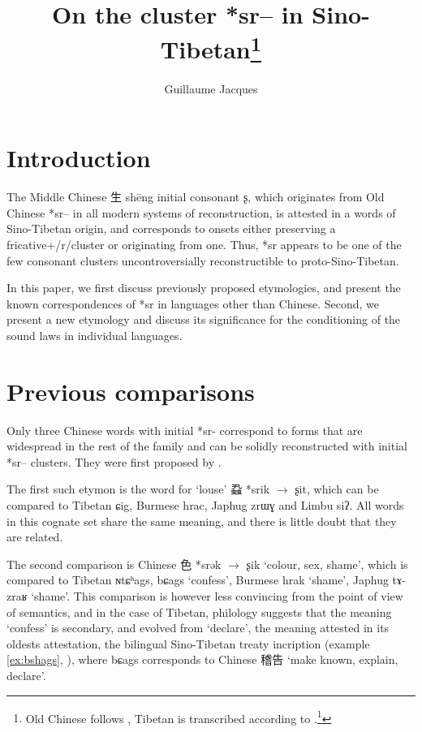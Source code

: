 \documentclass[oldfontcommands,oneside,a4paper,11pt]{article}
\newcommand{\ipa}[1]{{\phon #1}} %
\newcommand{\zh}[1]{{\cn #1}}
\begin{document}
 


\title{On the cluster *sr-- in Sino-Tibetan\footnote{Old Chinese follows \citealt{bs14oc}, Tibetan is transcribed according to \citet{jacques12transcription}.\footnote{Acknowledgements %
}}}
\author{Guillaume Jacques}
\maketitle

\section{Introduction}

The Middle Chinese \zh{生} shēng initial consonant \ipa{ʂ}, which originates from Old Chinese *\ipa{sr--} in all modern systems of reconstruction, is attested in a words of Sino-Tibetan origin, and corresponds to onsets either preserving a fricative+/r/cluster or originating from one. Thus, *sr appears to be  one of the few consonant clusters uncontroversially reconstructible to proto-Sino-Tibetan. 

In this paper, we first discuss previously proposed etymologies, and present the known correspondences of *sr in languages other than Chinese. Second, we present a new etymology and discuss its significance for the conditioning of the sound laws in individual languages.

\section{Previous comparisons} \label{sec:previous}
Only three Chinese words with initial *\ipa{sr-} correspond to forms that are widespread in the rest of the family and can be solidly reconstructed with initial *\ipa{sr--} clusters.  They were first proposed by \citet{benedict72}.

The first such etymon is the word for `louse' \zh{蝨} *\ipa{srik} $\rightarrow$ \ipa{ʂit}, which can be compared to Tibetan \ipa{ɕig}, Burmese \ipa{hrac}, Japhug \ipa{zrɯɣ} and Limbu \ipa{siʔ}. All words in this cognate set share the same meaning, and there is little doubt that they are related.

The second comparison is Chinese \zh{色} *\ipa{srək} $\rightarrow$ \ipa{ʂik} `colour, sex, shame', which is compared to Tibetan \ipa{ɴtɕʰags}, \ipa{bɕags} `confess', Burmese \ipa{hrak} `shame', Japhug \ipa{tɤ-zraʁ} `shame'. This comparison is however less convincing from the point of view of semantics, and in the case of Tibetan, philology suggests that the meaning `confess' is secondary, and evolved from `declare', the meaning attested in its oldests attestation, the bilingual Sino-Tibetan treaty incription (example \ref{ex:bshags}, \citealt[40,80]{licoblin87}), where 	\ipa{bɕags} corresponds to Chinese \zh{稽告} `make known, explain, declare'.
\end{document}
